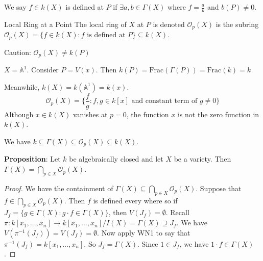\documentclass{report}
\begin{document}
We say $f \in k(X)$ is defined at $P$ if $\exists a, b \in \Gamma(X)$  where $f = \frac{a}{b}$ and $b(P) \neq 0$.

\begin{definition}{Local Ring at a Point}
    The local ring of $X$ at $P$ is denoted $\mathcal{O}_{p}(X)$ is the subring $\mathcal{O}_{p}(X) = \{f \in k(X) : f \text{ is defined at $P$}\} \subseteq k(X)$.
\end{definition}

Caution: $\mathcal{O}_{p}(X)\neq k(P)$ 

\begin{examples}
    \begin{example}
        $X = \mathbb{A}^{1}$. Consider $P = V(x)$. Then $k(P) = \text{Frac}(\Gamma(P)) = \text{Frac}(k) = k$

        Meanwhile, $k(X) = k(\mathbb{A}^{1}) = k(x)$. 
            \begin{equation*}
                \mathcal{O}_{p}(X) = \{\frac{f}{g} : f, g \in k[x]\text{ and constant term of $g \neq 0$}\}
            \end{equation*}
        Although $x \in k(X)$ vanishes at $p = 0$, the function $x$ is not the zero function in $k(X)$.
    \end{example}
\end{examples}

We have $k \subseteq \Gamma(X) \subseteq \mathcal{O}_{p}(X) \subseteq k(X)$.

\textbf{Proposition}: Let $k$ be algebraically closed and let $X$ be a variety. Then $\Gamma(X) = \bigcap_{p \in X}^{} \mathcal{O}_{p}(X)$.
    \begin{proof}
        We have the containment of $\Gamma(X) \subseteq \bigcap_{p \in X}^{} \mathcal{O}_{p}(X)$. Suppose that $f \in \bigcap_{p \in X}^{} \mathcal{O}_{p}(X)$. Then $f$ is defined every where so if $J_{f} = \{g \in \Gamma(X) : g\cdot f \in \Gamma(X)\}$, then $V(J_{f}) = \emptyset$. Recall $\pi : k[x_{1}, \ldots , x_{n}] \rightarrow k[x_{1}, \ldots , x_{n}] /I(X) = \Gamma(X) \supseteq J_{f}$. We have $V(\pi^{-1}(J_{f})) = V(J_{f}) = \emptyset$. Now apply WN1 to say that $\pi^{-1}(J_{f}) = k[x_{1}, \ldots , x_{n}]$. So $J_{f} = \Gamma(X)$. Since $1 \in J_{f}$, we have $1 \cdot f \in \Gamma(X)$.
    \end{proof}
\end{document}

